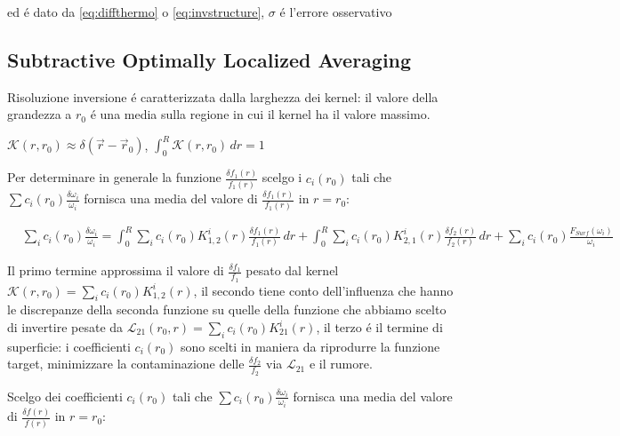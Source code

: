 \documentclass[../main.tex]{subfiles}
\begin{document}
\begin{workout}
ed \'e dato da \eqref{eq:diffthermo} o \eqref{eq:invstructure}, $\sigma$ \'e l'errore osservativo
\end{workout}

\subsection{Subtractive Optimally Localized Averaging}

\begin{workout}
Risoluzione inversione \'e caratterizzata dalla larghezza dei kernel: il valore della grandezza a $r_0$ \'e una media sulla regione in cui il kernel ha il valore massimo.
\end{workout}

\begin{workout}[OLA]
$\mathcal{K}(r,r_0)\approx\delta(\vec{r}-\vec{r}_0)$, $\int_0^R\mathcal{K}(r,r_0)\,dr=1$
\end{workout}

\begin{workout}

Per determinare in generale la funzione $\frac{\delta f_1(r)}{f_1(r)}$ scelgo i $c_i(r_0)$ tali che $\sum c_i(r_0)\frac{\delta\omega_i}{\omega_i}$ fornisca una media del valore di $\frac{\delta f_1(r)}{f_1(r)}$ in $r=r_0$:

\begin{align*}
&\sum_ic_i(r_0)\frac{\delta\omega_i}{\omega_i}=\int_0^R\sum_ic_i(r_0)K_{1,2}^i(r)\frac{\delta f_1(r)}{f_1(r)}\,dr+\int_0^R\sum_ic_i(r_0)K_{2,1}^i(r)\frac{\delta f_2(r)}{f_2(r)}\,dr+\sum_ic_i(r_0)\frac{F_{Surf}(\omega_i)}{\omega_i}
\end{align*}

Il primo termine approssima il valore di $\frac{\delta f_1}{f_1}$ pesato dal kernel $\mathcal{K}(r,r_0)=\sum_ic_i(r_0)K_{1,2}^i(r)$, il secondo tiene conto dell'influenza che hanno le discrepanze della seconda funzione su quelle della funzione che abbiamo scelto di invertire pesate da $\mathcal{L}_{21}(r_0,r)=\sum_ic_i(r_0)K_{21}^i(r)$, il terzo \'e il termine di superficie: i coefficienti $c_i(r_0)$ sono scelti in maniera da riprodurre la funzione target, minimizzare la contaminazione delle $\frac{\delta f_2}{f_2}$ via $\mathcal{L}_{21}$ e il rumore.

\end{workout}

Scelgo dei coefficienti $c_i(r_0)$ tali che $\sum c_i(r_0)\frac{\delta\omega_i}{\omega_i}$ fornisca una media del valore di $\frac{\delta f(r)}{f(r)}$ in $r=r_0$:
\end{document}
